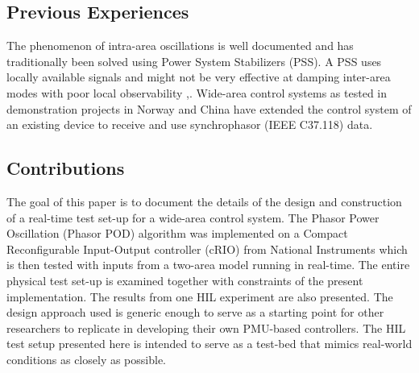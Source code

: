 \documentclass[conference]{IEEEtran}
\begin{document}
\subsection{Previous Experiences}
The phenomenon of intra-area oscillations is well documented and has traditionally been solved using Power System Stabilizers (PSS). A PSS uses locally available signals and might not be very effective at damping inter-area modes with poor local observability \cite{Yuwa},\cite{localREMcomparison}. Wide-area control systems as tested in demonstration projects in Norway \cite{WAPODNorway} and China \cite{WAPODChina} have extended the control system of an existing device to receive and use synchrophasor (IEEE C37.118) data.
\subsection{Contributions}
The goal of this paper is to document the details of the design and construction of a real-time test set-up for a wide-area control system. The Phasor Power Oscillation (Phasor POD) algorithm \cite{PhasorPOD} was implemented on a Compact Reconfigurable Input-Output controller (cRIO) \cite{cRIO9081} from National Instruments which is then tested with inputs from a two-area model\cite{KundurTwoArea} running in real-time. The entire physical test set-up is examined together with constraints of the present implementation. The results from one HIL experiment are also presented. The design approach used is generic enough to serve as a starting point for other researchers to replicate in developing their own PMU-based controllers. The HIL test setup presented here is intended to serve as a test-bed that mimics real-world conditions as closely as possible.
\end{document}
